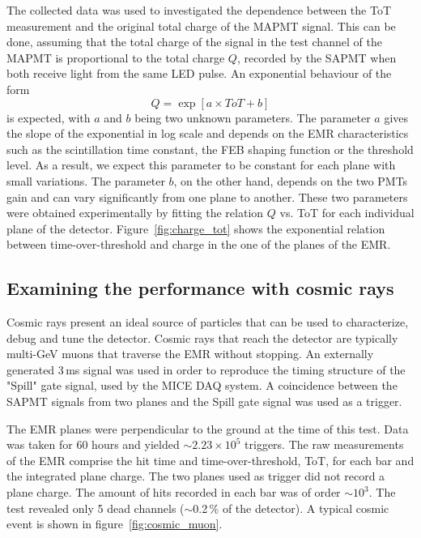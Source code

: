 \documentclass[a4paper,11pt]{article}
\begin{document}
The collected data was used to investigated the dependence between the ToT measurement and the original total charge of the MAPMT signal. This can be done,
assuming that the total charge of the signal in the test channel of the MAPMT is proportional to the total charge $Q$, recorded by the SAPMT when both
receive light from the same LED pulse. An exponential behaviour of the form
\begin{equation}
 Q=\exp\left[a\times ToT+b\right]
 \label{exp}
\end{equation}
is expected, with $a$ and $b$ being two unknown parameters. The parameter $a$ gives the slope of the exponential in log scale and depends on the EMR 
characteristics such as the scintillation time constant, the FEB shaping function or the threshold level. As a result, we expect this parameter to be
constant for each plane with small variations. The parameter $b$, on the other hand, depends on the two PMTs gain and can vary significantly from one
plane to another. These two parameters were obtained experimentally by fitting the relation $Q$ vs. ToT for each individual plane of the detector.
Figure~\ref{fig:charge_tot} shows the exponential relation between time-over-threshold and charge in the one of the planes of the EMR.

\subsection{Examining the performance with cosmic rays}\label{sec:cosmic_perf}
Cosmic rays present an ideal source of particles that can be used to characterize, debug and tune the detector. Cosmic rays that reach the detector are
typically multi-GeV muons that traverse the EMR without stopping. An externally generated 3\,ms signal was used in order to reproduce the timing structure
of the "Spill" gate signal, used by the MICE DAQ system. A coincidence between the SAPMT signals from two planes and the Spill gate signal was used
as a trigger.

The EMR planes were perpendicular to the ground at the time of this test. Data was taken for 60 hours and yielded $\sim2.23\times10^5$ triggers. The raw
measurements of the EMR comprise the hit time and time-over-threshold, ToT, for each bar and the integrated plane charge. The two planes used as trigger
did not record a plane charge. The amount of hits recorded in each bar was of order $\sim10^3$.  The test revealed only 5 dead channels ($\sim$0.2\,\% of
the detector). A typical cosmic event is shown in figure~\ref{fig:cosmic_muon}. 
\end{document}
